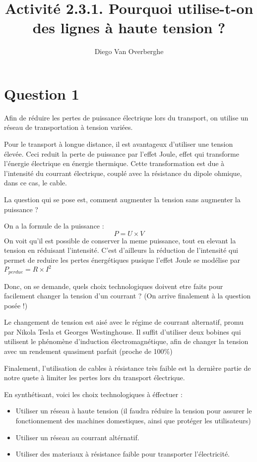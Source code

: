 \documentclass{scrartcl}
\title{Activité 2.3.1. Pourquoi utilise-t-on des lignes à haute tension ?}
\author{Diego Van Overberghe}
\begin{document}
    \maketitle

    \section*{Question 1}

    Afin de réduire les pertes de puissance électrique lors du transport, on utilise un réseau de transportation à tension variées.

    Pour le transport à longue distance, il est avantageux d'utiliser une tension élevée. Ceci reduit la perte de puissance par l'effet Joule, effet qui transforme l'énergie électrique en énergie thermique. Cette transformation est due à l'intensité du courrant électrique, couplé avec la résistance du dipole ohmique, dans ce cas, le cable.

    La question qui se pose est, comment augmenter la tension sans augmenter la puissance ?

    On a la formule de la puissance : \[P=U\times V\]
    On voit qu'il est possible de conserver la meme puissance, tout en elevant la tension en réduisant l'intensité. C'est d'ailleurs la réduction de l'intensité qui permet de reduire les pertes énergétiques pusique l'effet Joule se modélise par $P_{perdue}=R\times I^2$

    Donc, on se demande, quels choix technologiques doivent etre faits pour facilement changer la tension d'un courrant ? (On arrive finalement à la question posée !)

    Le changement de tension est aisé avec le régime de courrant alternatif, promu par Nikola Tesla et Georges Westinghouse. Il suffit d'utiliser deux bobines qui utilisent le phénomène d'induction électromagnétique, afin de changer la tension avec un rendement quasiment parfait (proche de 100\%)

    Finalement, l'utilisation de cables à résistance très faible est la dernière partie de notre quete à limiter les pertes lors du transport électrique.

    En synthétisant, voici les choix technologiques à éffectuer :
    \begin{itemize}
        \item Utiliser un réseau à haute tension (il faudra réduire la tension pour assurer le fonctionnement des machines domestiques, ainsi que protéger les utilisateurs)
        \item Utiliser un réseau au courrant altérnatif.
        \item Utiliser des materiaux à résistance faible pour transporter l'électricité.
    \end{itemize}
\end{document}
